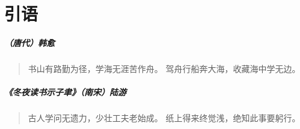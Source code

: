 \chapter{引语}

\paragraph{（唐代）韩愈}
\begin{quote}
  书山有路勤为径，学海无涯苦作舟。\newline
  驾舟行船奔大海，收藏海中学无边。
\end{quote}

\paragraph{《冬夜读书示子聿》（南宋）陆游}
\begin{quote}
  古人学问无遗力，少壮工夫老始成。\newline
  纸上得来终觉浅，绝知此事要躬行。
\end{quote}
